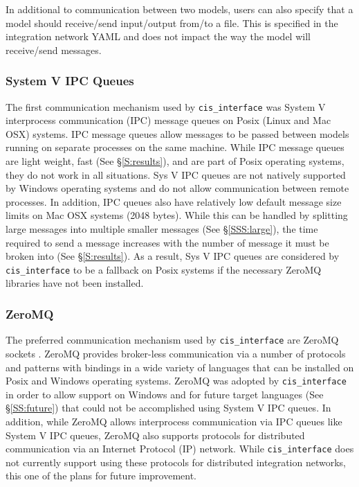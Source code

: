\documentclass[journal]{IEEEtran}
\newcommand{\cis}{{\tt cis\_interface}{}}
\begin{document}
In additional to communication between two models, users can also specify that a 
model should receive/send input/output from/to a file. This is specified in 
the integration network YAML and does not impact the way the model will 
receive/send messages.

\subsubsection{System V IPC Queues}\label{SSS:ipc}
%
The first communication mechanism used by {\cis} was System V interprocess 
communication (IPC) message queues \citep{Rusling1999} on Posix (Linux and Mac OSX) systems. 
IPC message queues allow messages to be passed between models running on separate 
processes on the same machine. While IPC message queues are light weight, fast 
(See \S\ref{S:results}), and are part of Posix operating systems, they do not work in all 
situations. Sys V IPC queues are not natively supported by Windows operating systems 
and do not allow communication between remote processes. In addition, IPC queues also 
have relatively low default message size limits on Mac OSX systems (2048 bytes). 
While this can be handled by splitting large messages into multiple smaller messages 
(See \S\ref{SSS:large}), the time required to send a message increases with the number of 
message it must be broken into (See \S\ref{S:results}). As a result, Sys V IPC queues are considered by 
{\cis} to be a fallback on Posix systems if the necessary ZeroMQ libraries have 
not been installed.

\subsubsection{ZeroMQ}\label{SSS:zmq}
%
The preferred communication mechanism used by {\cis} are ZeroMQ sockets 
\citep{Akgul2013}. ZeroMQ 
provides broker-less communication via a number of protocols and patterns with 
bindings in a wide variety of languages that can be installed on Posix and Windows 
operating systems. ZeroMQ was adopted by {\cis} in order to allow support 
on Windows and for future target languages (See \S\ref{SS:future}) that could not be 
accomplished using System V IPC queues. In addition, while ZeroMQ allows 
interprocess communication via IPC queues like System V IPC queues, ZeroMQ also 
supports protocols for distributed communication via an Internet Protocol (IP) 
network. While {\cis} does not currently support using these protocols 
for distributed integration networks, this one of the plans for future improvement.
\end{document}
